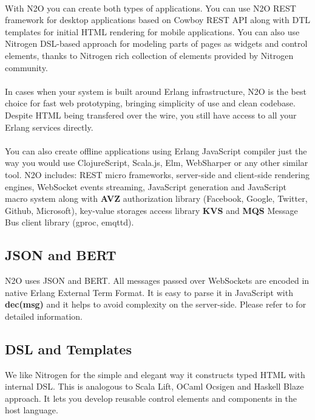 \paragraph{}
With N2O you can create both types of applications. You can use N2O REST framework
for desktop applications based on Cowboy REST API along with DTL
templates for initial HTML rendering for mobile applications.
You can also use Nitrogen DSL-based approach for modeling parts of pages
as widgets and control elements, thanks to Nitrogen
rich collection of elements provided by Nitrogen community.

\paragraph{}
In cases when your system is built around Erlang infrastructure, N2O
is the best choice for fast web prototyping, bringing simplicity
of use and clean codebase. Despite HTML being transfered over the wire,
you still have access to all your Erlang services directly.

\paragraph{}
You can also create offline applications using Erlang JavaScript compiler
just the way you would use ClojureScript, Scala.js, Elm, WebSharper
or any other similar tool. N2O includes: REST micro frameworks,
server-side and client-side rendering engines,
WebSocket events streaming, JavaScript generation
and JavaScript macro system along with {\bf AVZ} authorization
library (Facebook, Google, Twitter, Github, Microsoft), key-value storages
access library {\bf KVS} and {\bf MQS} Message Bus client library (gproc, emqttd).

\subsection{JSON and BERT}
N2O uses JSON and BERT. All messages passed over
WebSockets are encoded in native Erlang External Term Format.
It is easy to parse it in JavaScript with {\bf dec(msg)}
and it helps to avoid complexity on the server-side. Please refer
to  for detailed information.

\subsection{DSL and Templates}
We like Nitrogen for the simple and elegant way it constructs typed
HTML with internal DSL. This is analogous to Scala Lift,
OCaml Ocsigen and Haskell Blaze approach. It lets you develop reusable control
elements and components in the host language.

